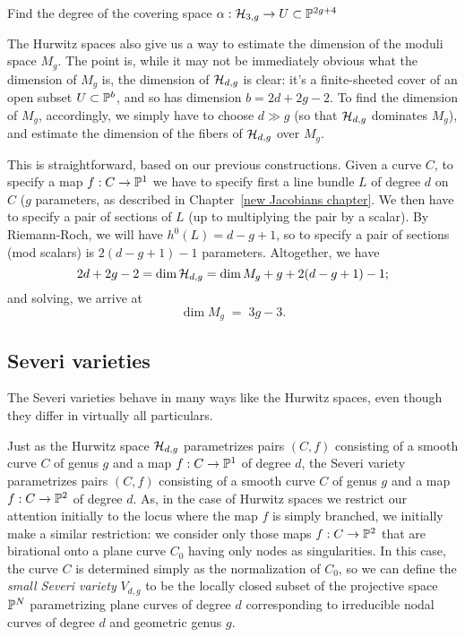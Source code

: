 \begin{exercise}
Find the degree of the covering space $\alpha : \cH_{3,g} \to U \subset \PP^{2g+4}$
\end{exercise}

The Hurwitz spaces also give us a way to estimate the dimension of the moduli space $M_g$. The point is, while it may not be immediately obvious what the dimension of $M_g$ is, the dimension of $\cH_{d,g}$ is clear: it's a finite-sheeted cover of an open subset $U \subset \PP^b$, and so has dimension  $b = 2d+2g-2$. To find the dimension of $M_g$, accordingly, we simply have to choose $d \gg g$ (so that $\cH_{d,g}$ dominates $M_g$), and estimate the dimension of the fibers of $\cH_{d,g}$ over $M_g$.

This is straightforward, based on our previous constructions. Given a curve $C$, to specify a map $f : C \to \PP^1$ we have to specify first a line bundle $L$ of degree $d$ on $C$ ($g$ parameters, as described in Chapter~\ref{new Jacobians chapter}. We then have to specify a pair of sections of $L$ (up to multiplying the pair by a scalar). By Riemann-Roch, we will have $h^0(L) = d-g+1$, so to specify a pair of sections (mod scalars) is $2(d-g+1)-1$ parameters. Altogether, we have
$$
2d+2g-2 = \dim \cH_{d,g} = \dim M_g + g + 2(d-g+1)-1;
$$
and solving, we arrive at
$$
\dim M_g \; = \; 3g-3.
$$




\subsection{Severi varieties}

The Severi varieties behave in many ways like the Hurwitz spaces, even though they differ in virtually all particulars.

Just as the Hurwitz space $\cH_{d,g}$ parametrizes pairs $(C,f)$ consisting of a smooth curve $C$ of genus $g$ and a map $f : C \to \PP^1$ of degree $d$, the Severi variety parametrizes pairs $(C,f)$ consisting of a smooth curve $C$ of genus $g$ and a map $f : C \to \PP^2$ of degree $d$. As, in the case of Hurwitz spaces we restrict our attention initially to the locus where the map $f$ is simply branched, we initially make a similar restriction: we consider only those maps $f : C \to \PP^2$ that are birational onto a plane curve $C_0$ having only nodes as singularities. In this case, the curve $C$ is determined simply as the normalization of $C_0$, so we can define the \emph{small Severi variety} $V_{d,g}$ to be the locally closed subset of the projective space $\PP^N$ parametrizing plane curves of degree $d$ corresponding to irreducible nodal curves of degree $d$ and geometric genus $g$.

